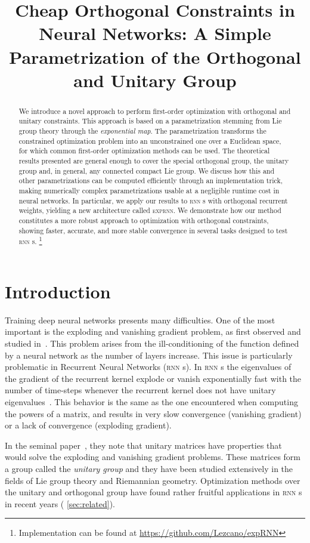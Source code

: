 \title{Cheap Orthogonal Constraints in Neural Networks: A Simple Parametrization of the Orthogonal and Unitary Group}

\begin{abstract}
We introduce a novel approach to perform first-order optimization with orthogonal and unitary constraints. This approach is based on a parametrization stemming from Lie group theory through the \emph{exponential map}. The parametrization transforms the constrained optimization problem into an unconstrained one over a Euclidean space, for which common first-order optimization methods can be used. The theoretical results presented are general enough to cover the special orthogonal group, the unitary group and, in general, any connected compact Lie group. We discuss how this and other parametrizations can be computed efficiently through an implementation trick, making numerically complex parametrizations usable at a negligible runtime cost in neural networks. In particular, we apply our results to \textsc{rnn} s with orthogonal recurrent weights, yielding a new architecture called \textsc{exprnn}.
We demonstrate how our method constitutes a more robust approach to optimization with orthogonal constraints, showing faster, accurate, and more stable convergence in several tasks designed to test \textsc{rnn} s.
\ifdefined\isarxiv
\footnote{Implementation can be found at \url{https://github.com/Lezcano/expRNN}}
\fi
\end{abstract}

\section{Introduction}
Training deep neural networks presents many difficulties. One of the most important is the exploding and vanishing gradient problem, as first observed and studied in~\cite{bengio1994learning}. This problem arises from the ill-conditioning of the function defined by a neural network as the number of layers increase. This issue is particularly problematic in Recurrent Neural Networks (\textsc{rnn} s). In \textsc{rnn} s the eigenvalues of the gradient of the recurrent kernel explode or vanish exponentially fast with the number of time-steps whenever the recurrent kernel does not have unitary eigenvalues~\cite{arjovsky2016unitary}. This behavior is the same as the one encountered when computing the powers of a matrix, and results in very slow convergence (vanishing gradient) or a lack of convergence (exploding gradient).

In the seminal paper~\cite{arjovsky2016unitary}, they note that unitary matrices have properties that would solve the exploding and vanishing gradient problems. These matrices form a group called the \emph{unitary group} and they have been studied extensively in the fields of Lie group theory and Riemannian geometry. Optimization methods over the unitary and orthogonal group have found rather fruitful applications in \textsc{rnn} s in recent years (\cf{} \ref{sec:related}).


